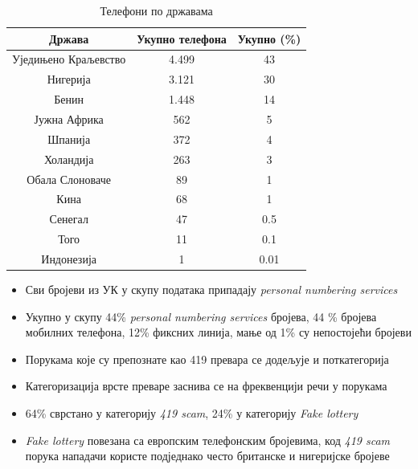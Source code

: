 \documentclass[compress, containsverbatim,mathserif, xcolor=dvipsnames, unicode]{beamer}
\begin{document}
\begin{frame}
\begin{table}[h!]
\begin{center}
\caption{Телефони по државама}
\begin{tabular}{|c|c|c|} \hline
\textbf{Држава} & \textbf{Укупно телефона} & \textbf{Укупно (\%)}\\ \hline
Уједињено Краљевство & 4.499 & 43\\ \hline
Нигерија & 3.121 & 30\\ \hline
Бенин & 1.448 & 14\\ \hline
Јужна Африка & 562 & 5\\ \hline
Шпанија & 372 & 4\\ \hline
Холандија & 263 & 3\\ \hline
Обала Слоноваче & 89 & 1\\ \hline
Кина & 68 & 1\\ \hline
Сенегал & 47 & 0.5\\ \hline
Того & 11 & 0.1\\ \hline
Индонезија & 1 & 0.01\\ \hline
\end{tabular}
\label{tab:tabela2}
\end{center}
\end{table}
\begin{itemize}
	\item Сви бројеви из УК у скупу података припадају \emph{personal numbering services}
	\item Укупно у скупу 44\% \emph{personal numbering services} бројева, 44 \% бројева мобилних телефона, 12\% фиксних линија, мање од 1\% су непостојећи бројеви
\end{itemize}
\end{frame}


\begin{frame}
\begin{itemize}
	\item Порукама које су препознате као 419 превара се додељује и поткатегорија
	\item Категоризација врсте преваре заснива се на фреквенцији речи у порукама
	\item 64\% сврстано у категорију \emph{419 scam}, 24\% у категорију \emph{Fake lottery}
	\item \emph{Fake lottery} повезана са европским телефонским бројевима, код \emph{419 scam} порука нападачи користе подједнако често британске и нигеријске бројеве		
\end{itemize}
\end{frame}
\end{document}
